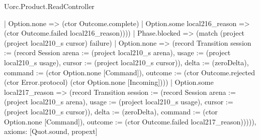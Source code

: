\begin{lexlean}{Uorc.Product.ReadController}
\begin{semanticmodule}
{{      | Option.none => (ctor Outcome.complete)
      | Option.some local216_reason => (ctor Outcome.failed local216_reason)))})
    | Phase.blocked => (match (project (project local210_s cursor) failure)
      | Option.none => (record Transition {session := (record Session {arena := (project local210_s arena), usage := (project local210_s usage), cursor := (project local210_s cursor)}), delta := (zeroDelta), command := (ctor Option.none [Command]), outcome := (ctor Outcome.rejected (ctor Error.protocol) (ctor Option.none [Incoming]))})
      | Option.some local217_reason => (record Transition {session := (record Session {arena := (project local210_s arena), usage := (project local210_s usage), cursor := (project local210_s cursor)}), delta := (zeroDelta), command := (ctor Option.none [Command]), outcome := (ctor Outcome.failed local217_reason)})))),
  axioms: [Quot.sound, propext]
}


\end{semanticmodule}
\end{lexlean}
